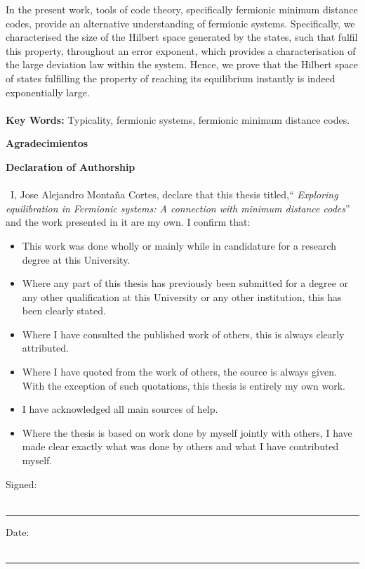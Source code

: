 \indent In the present work, tools of code theory, specifically fermionic minimum distance codes, provide an alternative understanding of fermionic systems. Specifically, we characterised the size of the Hilbert space generated by the states, such that fulfil this property, throughout an error exponent, which provides a characterisation of the large deviation law within the system. Hence, we prove that the Hilbert space of states fulfilling the property of reaching its equilibrium instantly is indeed exponentially large.\\\\
\textbf{\small Key Words: }Typicality, fermionic systems, fermionic minimum distance codes.
\newpage{}

\textbf{\LARGE Agradecimientos}

\newpage{}
\textbf{\LARGE Declaration of Authorship}\\\\
\
I, Jose Alejandro Montaña Cortes, declare that this thesis titled,`` \textit{Exploring equilibration in Fermionic systems: A connection with minimum distance codes}'' and the work presented in it are my own. I confirm that:

\begin{itemize} 
\item This work was done wholly or mainly while in candidature for a research degree at this University.
\item Where any part of this thesis has previously been submitted for a degree or any other qualification at this University or any other institution, this has been clearly stated.
\item Where I have consulted the published work of others, this is always clearly attributed.
\item Where I have quoted from the work of others, the source is always given. With the exception of such quotations, this thesis is entirely my own work.
\item I have acknowledged all main sources of help.
\item Where the thesis is based on work done by myself jointly with others, I have made clear exactly what was done by others and what I have contributed myself.\\
\end{itemize}
 
\noindent Signed:\\\\

\rule[0.5em]{25em}{0.5pt} %
 
\noindent Date:\\\\

\rule[0.5em]{25em}{0.5pt} %
\newpage{}